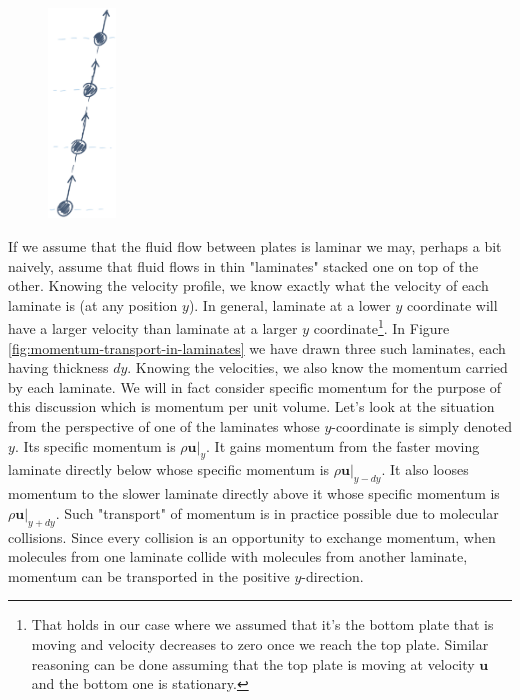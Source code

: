 \documentclass[10pt,twocolumn]{article}
\begin{document}
\begin{figure}
\centering\includegraphics[width=1.8cm]{molecular-collisions.png}
\label{fig:molecular-collisions}
\end{figure}
If we assume that the fluid flow between plates is laminar we may, perhaps a bit naively, assume that fluid flows in thin "laminates" stacked one on top of the other. Knowing the velocity profile, we know exactly what the velocity of each laminate is (at any position $y$). In general, laminate at a lower $y$ coordinate will have a larger velocity than laminate at a larger $y$ coordinate\footnote{That holds in our case where we assumed that it's the bottom plate that is moving and velocity decreases to zero once we reach the top plate. Similar reasoning can be done assuming that the top plate is moving at velocity $\mathbf{u}$ and the bottom one is stationary.}.
In Figure \ref{fig:momentum-transport-in-laminates} we have drawn three such laminates, each having thickness $dy$.
Knowing the velocities, we also know the momentum carried by each laminate. We will in fact consider specific momentum for the purpose of this discussion which is momentum per unit volume. Let's look at the situation from the perspective of one of the laminates whose $y$-coordinate is simply denoted $y$. Its specific momentum is $\rho \mathbf{u}|_{y}$.  It gains momentum from the faster moving laminate directly below whose specific momentum is $\rho \mathbf{u}|_{y-dy}$. It also looses momentum to the slower laminate directly above it whose specific momentum is $\rho \mathbf{u}|_{y+dy}$. Such "transport" of momentum is in practice possible due to molecular collisions. Since every collision is an opportunity to exchange momentum, when molecules from one laminate collide with molecules from another laminate, momentum can be transported in the positive $y$-direction. 
\end{document}
